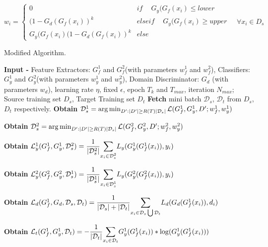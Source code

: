 \begin{equation}
                w_{i} = \begin{cases}
		            0 & if\ \quad G_y(G_f(x_i) \le lower \\
		            (1 - G_d(G_f(x_i))^k & elseif\ \quad G_y(G_f(x_i) \ge upper \\
		            G_y(G_f(x_i)(1 - G_d(G_f(x_i))^k & else\ 
		            \end{cases} \quad \forall x_i \in D_s
\end{equation}


\begin{algorithm}[H]
	\caption{Modified Algorithm.} 
	\begin{algorithmic}[1]
	    \State \textbf{Input -} Feature Extractors: $G_{f}^1$ and $G_{f}^2$(with parameters $w_{f}^1$ and $w_{f}^2$), Classifiers: $G_{y}^1$ and $G_{y}^2$(with parameters $w_{y}^1$ and $w_{y}^2$), Domain Discriminator: $G_d$ (with parameters $w_d$), learning rate $\eta$, fixed $\epsilon$, epoch $T_k$ and $T_{max}$, iteration $N_{max}$;
		\For {$T=1,2,\ldots, T_{max}$}
		    \State Source training set ${D_s}$, Target Training set ${D_t}$
				    \State \textbf{Fetch} mini batch $\mathcal{D}_s$, $\mathcal{D}_t$ from ${D_s}$, ${D_t}$ respectively.
				    \State \textbf{Obtain} $\mathcal{D}_{s}^1 = \operatorname*{arg\,min}_{D':|D'|\geq R(T)|\mathcal{D}_{s}|} \mathcal{L}(G_{f}^1, G_{y}^1, D'; w_{f}^1, w_{y}^1)$ 
				    
				    \State \textbf{Obtain} $\mathcal{D}_{s}^2 = \operatorname*{arg\,min}_{D':|D'|\geq R(T)|\mathcal{D}_{s}|} \mathcal{L}(G_{f}^2, G_{y}^2, D'; w_{f}^2, w_{y}^2)$
				
				    \State \textbf{Obtain} $\mathcal{L}_{y}^1(G_{f}^1, G_{y}^1,\mathcal{D}_{s}^2) =\dfrac{1}{|\mathcal{D}_{s}^2|} \mathlarger\sum\limits_{x_i \in \mathcal{D}_{s}^2} L_y(G_{y}^1(G_{f}^1(x_i)),y_i)$
				    
                    \State \textbf{Obtain} $\mathcal{L}_{y}^2(G_{f}^2, G_{y}^2, \mathcal{D}_{s}^1) =\dfrac{1}{|\mathcal{D}_{s}^1|} \mathlarger\sum\limits_{x_i \in \mathcal{D}_{s}^1} L_y(G_{y}^2(G_{f}^2(x_i)),y_i)$
				    
				    \State \textbf{Obtain} $\mathcal{L}_d(G_{f}^1, G_{d}, \mathcal{D}_s, \mathcal{D}_t) = \dfrac{1}{|\mathcal{D}_s| + |\mathcal{D}_t|} \mathlarger\sum\limits_{x_i \in \mathcal{D}_s \bigcup \mathcal{D}_t} L_d(G_d(G_{f}^1(x_i)), d_i)$
				    
				    \State \textbf{Obtain} $\mathcal{L}_t(G_{f}^1, G_{y}^1, \mathcal{D}_t) = - \dfrac{1}{|\mathcal{D}_t|} \mathlarger\sum\limits_{x_i \in \mathcal{D}_t} G_{y}^1(G_{f}^1(x_i))*\log(G_{y}^1(G_{f}^1(x_i)))$
				    

\end{algorithmic}
\end{algorithm}
